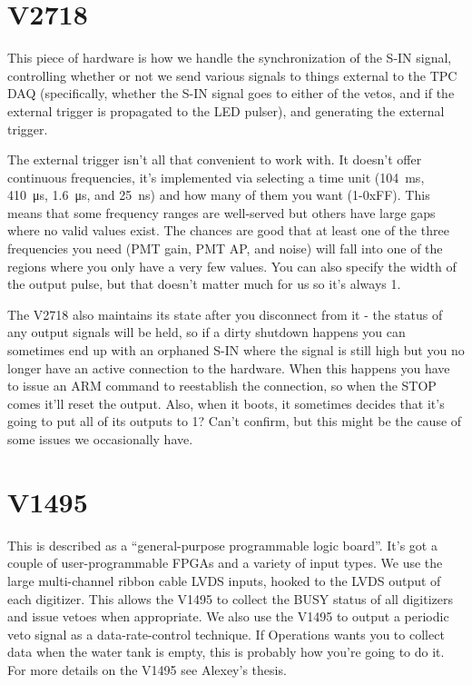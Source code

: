 \section{V2718}\label{sec:v2718}

This piece of hardware is how we handle the synchronization of the S-IN signal, controlling whether or not we send various signals to things external to the TPC DAQ (specifically, whether the S-IN signal goes to either of the vetos, and if the external trigger is propagated to the LED pulser), and generating the external trigger.

The external trigger isn't all that convenient to work with.
It doesn't offer continuous frequencies, it's implemented via selecting a time unit (\SI{104}{\milli\second}, \SI{410}{\micro\second}, \SI{1.6}{\micro\second}, and \SI{25}{\nano\second}) and how many of them you want (1-0xFF).
This means that some frequency ranges are well-served but others have large gaps where no valid values exist.
The chances are good that at least one of the three frequencies you need (PMT gain, PMT AP, and noise) will fall into one of the regions where you only have a very few values.
You can also specify the width of the output pulse, but that doesn't matter much for us so it's always 1.

The V2718 also maintains its state after you disconnect from it - the status of any output signals will be held, so if a dirty shutdown happens you can sometimes end up with an orphaned S-IN where the signal is still high but you no longer have an active connection to the hardware.
When this happens you have to issue an ARM command to reestablish the connection, so when the STOP comes it'll reset the output.
Also, when it boots, it sometimes decides that it's going to put all of its outputs to 1?
Can't confirm, but this might be the cause of some issues we occasionally have.

\section{V1495}

This is described as a ``general-purpose programmable logic board''.
It's got a couple of user-programmable FPGAs and a variety of input types.
We use the large multi-channel ribbon cable LVDS inputs, hooked to the LVDS output of each digitizer.
This allows the V1495 to collect the BUSY status of all digitizers and issue vetoes when appropriate.
We also use the V1495 to output a periodic veto signal as a data-rate-control technique.
If Operations wants you to collect data when the water tank is empty, this is probably how you're going to do it.
For more details on the V1495 see Alexey's thesis.

